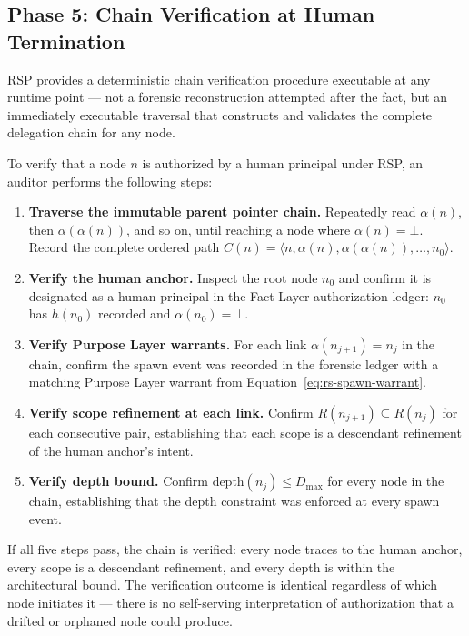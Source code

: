 \subsection{Phase 5: Chain Verification at Human Termination}
\label{sec:rs-phase5}

RSP provides a deterministic chain verification procedure executable at any runtime point — not a forensic reconstruction attempted after the fact, but an immediately executable traversal that constructs and validates the complete delegation chain for any node.

To verify that a node $n$ is authorized by a human principal under RSP, an auditor performs the following steps:

\begin{enumerate}
    \item[(V1)] \textbf{Traverse the immutable parent pointer chain.} Repeatedly read $\alpha(n)$, then $\alpha(\alpha(n))$, and so on, until reaching a node where $\alpha(n) = \bot$. Record the complete ordered path $C(n) = \langle n, \alpha(n), \alpha(\alpha(n)), \ldots, n_0 \rangle$.

    \item[(V2)] \textbf{Verify the human anchor.} Inspect the root node $n_0$ and confirm it is designated as a human principal in the Fact Layer authorization ledger: $n_0$ has $h(n_0)$ recorded and $\alpha(n_0) = \bot$.

    \item[(V3)] \textbf{Verify Purpose Layer warrants.} For each link $\alpha(n_{j+1}) = n_j$ in the chain, confirm the spawn event was recorded in the forensic ledger with a matching Purpose Layer warrant from Equation~\ref{eq:rs-spawn-warrant}.

    \item[(V4)] \textbf{Verify scope refinement at each link.} Confirm $R(n_{j+1}) \subseteq R(n_j)$ for each consecutive pair, establishing that each scope is a descendant refinement of the human anchor's intent.

    \item[(V5)] \textbf{Verify depth bound.} Confirm $\text{depth}(n_j) \leq D_{\max}$ for every node in the chain, establishing that the depth constraint was enforced at every spawn event.
\end{enumerate}

If all five steps pass, the chain is verified: every node traces to the human anchor, every scope is a descendant refinement, and every depth is within the architectural bound. The verification outcome is identical regardless of which node initiates it — there is no self-serving interpretation of authorization that a drifted or orphaned node could produce.

